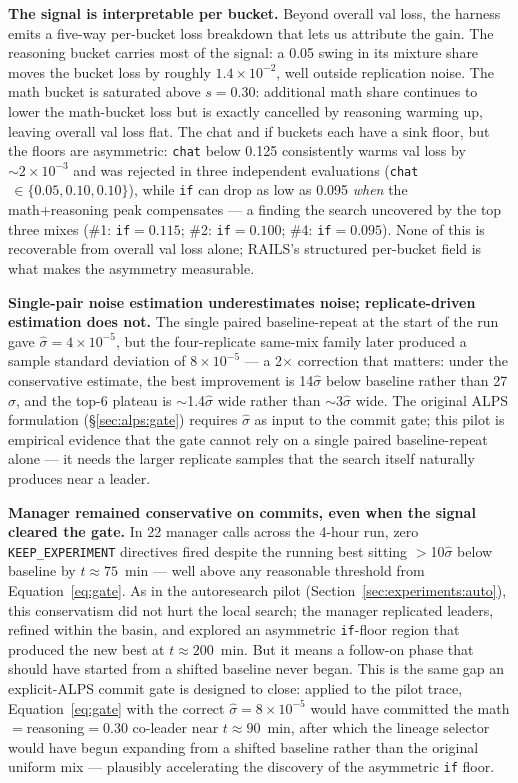 \documentclass{article}
\newcommand{\alps}{ALPS\xspace}
\newcommand{\rails}{RAILS\xspace}
\newcommand{\keep}{\texttt{KEEP\_EXPERIMENT}\xspace}
\newenvironment{addedblock}{\par\color{blue}}{\par}
\begin{document}
\begin{addedblock}
\textbf{The signal is interpretable per bucket.} Beyond overall val loss, the harness emits a five-way per-bucket loss breakdown that lets us attribute the gain. The reasoning bucket carries most of the signal: a 0.05 swing in its mixture share moves the bucket loss by roughly $1.4 \times 10^{-2}$, well outside replication noise. The math bucket is saturated above $s = 0.30$: additional math share continues to lower the math-bucket loss but is exactly cancelled by reasoning warming up, leaving overall val loss flat. The chat and if buckets each have a sink floor, but the floors are asymmetric: \texttt{chat} below 0.125 consistently warms val loss by $\sim\!2 \times 10^{-3}$ and was rejected in three independent evaluations (\texttt{chat}$\,\in\!\{0.05, 0.10, 0.10\}$), while \texttt{if} can drop as low as 0.095 \emph{when} the math+reasoning peak compensates --- a finding the search uncovered by the top three mixes (\#1: \texttt{if}$=0.115$; \#2: \texttt{if}$=0.100$; \#4: \texttt{if}$=0.095$). None of this is recoverable from overall val loss alone; \rails's structured per-bucket field is what makes the asymmetry measurable.

\textbf{Single-pair noise estimation underestimates noise; replicate-driven estimation does not.} The single paired baseline-repeat at the start of the run gave $\hat\sigma = 4 \times 10^{-5}$, but the four-replicate same-mix family later produced a sample standard deviation of $8 \times 10^{-5}$ --- a 2$\times$ correction that matters: under the conservative estimate, the best improvement is 14$\hat\sigma$ below baseline rather than 27$\hat\sigma$, and the top-6 plateau is $\sim$1.4$\hat\sigma$ wide rather than $\sim$3$\hat\sigma$ wide. The original \alps formulation (\S\ref{sec:alps:gate}) requires $\hat\sigma$ as input to the commit gate; this pilot is empirical evidence that the gate cannot rely on a single paired baseline-repeat alone --- it needs the larger replicate samples that the search itself naturally produces near a leader.

\textbf{Manager remained conservative on commits, even when the signal cleared the gate.} In 22 manager calls across the 4-hour run, zero \keep directives fired despite the running best sitting $>$10$\hat\sigma$ below baseline by $t \approx 75$~min --- well above any reasonable threshold from Equation~\ref{eq:gate}. As in the autoresearch pilot (Section~\ref{sec:experiments:auto}), this conservatism did not hurt the local search; the manager replicated leaders, refined within the basin, and explored an asymmetric \texttt{if}-floor region that produced the new best at $t \approx 200$~min. But it means a follow-on phase that should have started from a shifted baseline never began. This is the same gap an explicit-\alps commit gate is designed to close: applied to the pilot trace, Equation~\ref{eq:gate} with the correct $\hat\sigma = 8\!\times\!10^{-5}$ would have committed the math$=$reasoning$=0.30$ co-leader near $t \approx 90$~min, after which the lineage selector would have begun expanding from a shifted baseline rather than the original uniform mix --- plausibly accelerating the discovery of the asymmetric \texttt{if} floor.


\end{addedblock}
\end{document}
